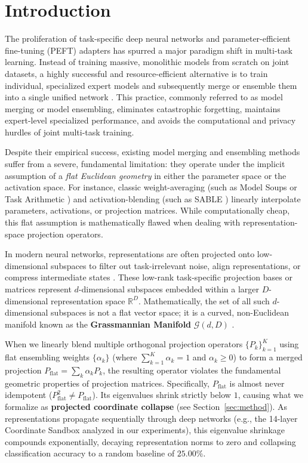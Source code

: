 \section{Introduction}
\label{sec:intro}

The proliferation of task-specific deep neural networks and parameter-efficient fine-tuning (PEFT) adapters has spurred a major paradigm shift in multi-task learning. Instead of training massive, monolithic models from scratch on joint datasets, a highly successful and resource-efficient alternative is to train individual, specialized expert models and subsequently merge or ensemble them into a single unified network \cite{wortsman22, ilharco22, yadav23, yu23, shen24}. This practice, commonly referred to as model merging or model ensembling, eliminates catastrophic forgetting, maintains expert-level specialized performance, and avoids the computational and privacy hurdles of joint multi-task training.

Despite their empirical success, existing model merging and ensembling methods suffer from a severe, fundamental limitation: they operate under the implicit assumption of a \emph{flat Euclidean geometry} in either the parameter space or the activation space. For instance, classic weight-averaging (such as Model Soups \cite{wortsman22} or Task Arithmetic \cite{wang22, ilharco22}) and activation-blending (such as SABLE \cite{dauner23}) linearly interpolate parameters, activations, or projection matrices. While computationally cheap, this flat assumption is mathematically flawed when dealing with representation-space projection operators. 

In modern neural networks, representations are often projected onto low-dimensional subspaces to filter out task-irrelevant noise, align representations, or compress intermediate states \cite{bengio13, stoica23}. These low-rank task-specific projection bases or matrices represent $d$-dimensional subspaces embedded within a larger $D$-dimensional representation space $\mathbb{R}^D$. Mathematically, the set of all such $d$-dimensional subspaces is not a flat vector space; it is a curved, non-Euclidean manifold known as the \textbf{Grassmannian Manifold} $\mathcal{G}(d, D)$ \cite{absil08, edelman98}. 

When we linearly blend multiple orthogonal projection operators $\{P_k\}_{k=1}^K$ using flat ensembling weights $\{\alpha_k\}$ (where $\sum_{k=1}^K \alpha_k = 1$ and $\alpha_k \geq 0$) to form a merged projection $P_{\text{flat}} = \sum_{k} \alpha_k P_k$, the resulting operator violates the fundamental geometric properties of projection matrices. Specifically, $P_{\text{flat}}$ is almost never idempotent ($P_{\text{flat}}^2 \neq P_{\text{flat}}$). Its eigenvalues shrink strictly below $1$, causing what we formalize as \textbf{projected coordinate collapse} (see Section~\ref{sec:method}). As representations propagate sequentially through deep networks (e.g., the 14-layer Coordinate Sandbox analyzed in our experiments), this eigenvalue shrinkage compounds exponentially, decaying representation norms to zero and collapsing classification accuracy to a random baseline of $25.00\%$.

